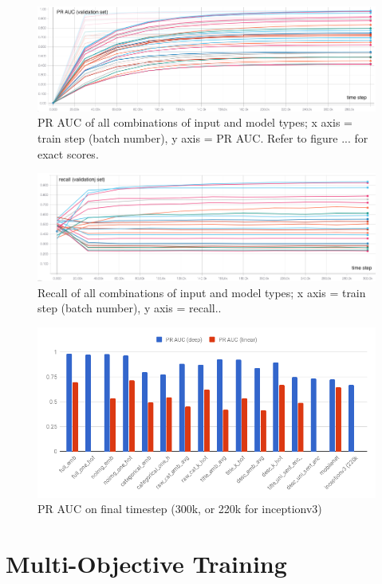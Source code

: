 \begin{figure}
  \includegraphics[width=\linewidth]{figures/pr_auc_all}
  \caption{PR AUC of all combinations of input and model types; x axis = train step (batch number), y axis = PR AUC. Refer to figure ... for exact scores.}
  \label{pr_auc_all}
\end{figure}
\begin{figure}
  \includegraphics[width=\linewidth]{figures/recall_all}
  \caption{Recall of all combinations of input and model types; x axis = train step (batch number), y axis = recall..}
  \label{recall_all}
\end{figure}

\begin{figure}
  \includegraphics[width=\linewidth]{figures/pr_auc_chart}
  \caption{PR AUC on final timestep (300k, or 220k for inceptionv3)}
  \label{pr_auc_chart}
\end{figure}


\section{Multi-Objective Training}
\label{multiobj}


